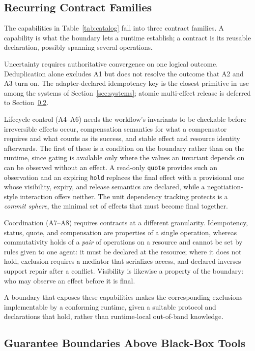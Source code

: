 \documentclass[runningheads]{comsis3}
\begin{document}
\subsection{Recurring Contract Families}

The capabilities in Table~\ref{tab:catalog} fall into three contract
families. A capability is what the boundary lets a runtime establish; a
contract is its reusable declaration, possibly spanning several
operations.

Uncertainty requires authoritative convergence on one logical outcome.
Deduplication alone excludes A1 but does not resolve the
outcome that A2 and A3 turn on. The adapter-declared idempotency key is the
closest primitive in use among the systems of Section~\ref{sec:systems};
atomic multi-effect release is deferred to
Section~\ref{sec:boundaries}.

Lifecycle control (A4--A6) needs the workflow's invariants to be checkable
before irreversible effects occur, compensation semantics for what a
compensator requires and what counts as its success, and stable effect and
resource identity afterwards. The first of these is a condition on the
boundary rather than on the runtime, since gating is available only where
the values an invariant depends on can be observed without an effect. A
read-only \texttt{quote} provides such an observation and an expiring
\texttt{hold} replaces the final effect with a provisional one whose
visibility, expiry, and release semantics are declared, while a
negotiation-style interaction offers neither. The unit dependency
tracking protects is a \emph{commit sphere}, the minimal set of effects that
must become final together.

Coordination (A7--A8) requires contracts at a different granularity.
Idempotency, status, quote, and compensation are properties of a single
operation, whereas commutativity holds of a \emph{pair} of operations on a
resource and cannot be set by rules given to one agent: it must be declared
at the resource; where it does not hold, exclusion requires a mediator that
serializes access, and declared inverses support repair after a conflict. Visibility is likewise a property of the boundary:
who may observe an effect before it is final.

A boundary that exposes these capabilities makes the corresponding
exclusions implementable by a conforming runtime, given a suitable protocol
and declarations that hold, rather than runtime-local out-of-band
knowledge.

\subsection{Guarantee Boundaries Above Black-Box Tools}
\label{sec:boundaries}
\end{document}
